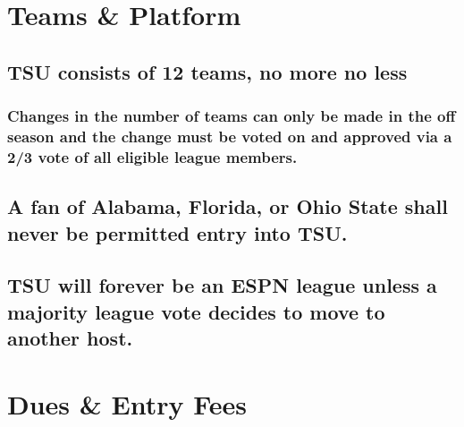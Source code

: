 \documentclass[
]{book}
\begin{document}
\hypertarget{teams-platform}{%
\section{Teams \& Platform}\label{teams-platform}}

\hypertarget{tsu-consists-of-12-teams-no-more-no-less}{%
\subsection{TSU consists of 12 teams, no more no less}\label{tsu-consists-of-12-teams-no-more-no-less}}

\hypertarget{changes-in-the-number-of-teams-can-only-be-made-in-the-off-season-and-the-change-must-be-voted-on-and-approved-via-a-23-vote-of-all-eligible-league-members.}{%
\subsubsection{Changes in the number of teams can only be made in the off season and the change must be voted on and approved via a 2/3 vote of all eligible league members.}\label{changes-in-the-number-of-teams-can-only-be-made-in-the-off-season-and-the-change-must-be-voted-on-and-approved-via-a-23-vote-of-all-eligible-league-members.}}

\hypertarget{a-fan-of-alabama-florida-or-ohio-state-shall-never-be-permitted-entry-into-tsu.}{%
\subsection{A fan of Alabama, Florida, or Ohio State shall never be permitted entry into TSU.}\label{a-fan-of-alabama-florida-or-ohio-state-shall-never-be-permitted-entry-into-tsu.}}

\hypertarget{tsu-will-forever-be-an-espn-league-unless-a-majority-league-vote-decides-to-move-to-another-host.}{%
\subsection{TSU will forever be an ESPN league unless a majority league vote decides to move to another host.}\label{tsu-will-forever-be-an-espn-league-unless-a-majority-league-vote-decides-to-move-to-another-host.}}

\hypertarget{dues-entry-fees}{%
\section{Dues \& Entry Fees}\label{dues-entry-fees}}
\end{document}
